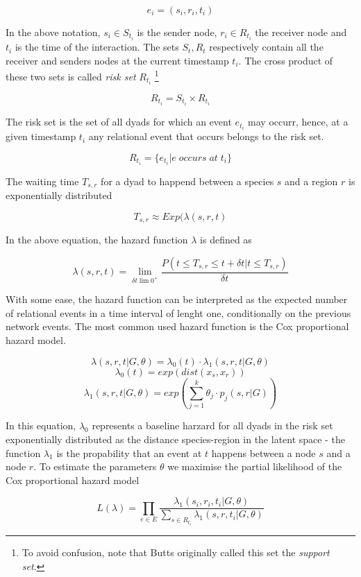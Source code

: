 \documentclass[mscthesis]{usiinfthesis}
\begin{document}
\[
e_i = (s_i, r_i, t_i)
\]

In the above notation, $s_i \in S_{t_i} $ is the sender node, $r_i \in R_{t_i}$ the receiver node and $t_i$ is the time of the interaction. The sets $S_t, R_t$ respectively contain all the receiver and senders nodes at the current timestamp $t_i$. The cross product of these two sets is called \textit{risk set} $R_{t_i}$  \footnote{\label{riskset_footnote}To avoid confusion, note that Butts originally called this set the \textit{support set}.}



\[
R_{t_i} = S_{t_i} \times R_{t_i}
\]

The risk set is the set of all dyads for which an event $e_{t_i}$ may occurr, hence, at a given timestamp $t_i$ any relational event that occurs belongs to the risk set.

\[
R_{t_i} = \{e_{t_i} | e \; occurs \; at \; t_i\}
\]

The waiting time $T_{s,r}$ for a dyad to happend between a species $s$ and a region $r$ is exponentially distributed 

\[
T_{s,r} \approx Exp(\lambda(s, r, t)
\]


In the above equation, the hazard function $\lambda$ is defined as

\[
\lambda(s, r, t) = \lim_{\delta t \lim 0^+} \frac{P(t \leq T_{s,r} \leq t + \delta t | t \leq T_{s,r})}{\delta t}
\]

With some ease, the hazard function can be interpreted as the expected number of relational events in a time interval of lenght one, conditionally on the previous network events. The most common used hazard function is the Cox proportional hazard model. 


\[
\lambda(s, r, t|G, \theta) = \lambda_0(t) \cdot \lambda_1(s, r, t|G, \theta)
\]
\[
\lambda_0(t) =  exp \left(dist(x_s, x_r) \right)
\]
\[
\lambda_1(s, r, t|G, \theta) = exp \left(\sum_{j=1}^k \theta_j \cdot p_j(s, r|G) \right)
\]

In this equation, $\lambda_0$ represents a baseline harzard for all dyads in the risk set exponentially distributed as the distance species-region in the latent space - the function $\lambda_1$ is the propability that an event at $t$ happens between a node $s$ and a node $r$. To estimate the parameters $\theta$ we maximise the partial likelihood of the Cox proportional hazard model 

\[
L(\lambda) =  \prod_{e \in E} \frac{\lambda_1(s_i, r_i, t_i | G, \theta)}{ \sum_{s \in R_{t_i}} \lambda_1(s, r, t_i | G, \theta)}
\]
\end{document}

